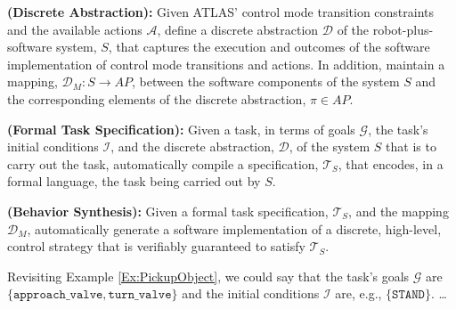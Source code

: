 
\begin{myProblem}\label{DiscreteAbstractionProblem}
\textbf{(Discrete Abstraction):}
Given ATLAS' control mode transition constraints and the available actions $\mathcal{A}$, define a discrete abstraction $\mathcal{D}$ of the robot-plus-software system, $S$, that captures the execution and outcomes of the software implementation of control mode transitions and actions.
In addition, maintain a mapping, $\mathcal{D}_M : S \rightarrow AP$, between the software components of the system $S$ and the corresponding elements of the discrete abstraction, $\pi \in AP$.
\end{myProblem}

\begin{myProblem}\label{SpecificationProblem}
\textbf{(Formal Task Specification):}
Given a task, in terms of goals $\mathcal{G}$, the task's initial conditions $\mathcal{I}$, and the discrete abstraction, $\mathcal{D}$, of the system $S$ that is to carry out the task, automatically compile a specification, $\mathcal{T}_S$, that encodes, in a formal language, the task being carried out by $S$.
\end{myProblem}

\begin{myProblem}\label{BehaviorSynthesisProblem}
\textbf{(Behavior Synthesis):}
Given a formal task specification, $\mathcal{T}_S$, and the mapping $\mathcal{D}_M$, automatically generate a software implementation of a discrete, high-level, control strategy that is verifiably guaranteed to satisfy $\mathcal{T}_S$.
\end{myProblem}

Revisiting Example \ref{Ex:PickupObject}, we could say that the task's goals $\mathcal{G}$ are $\{ \mathtt{approach\_valve}, \mathtt{turn\_valve} \}$ and the initial conditions $\mathcal{I}$ are, e.g., $\{ \mathtt{STAND} \}$.
\ldots

